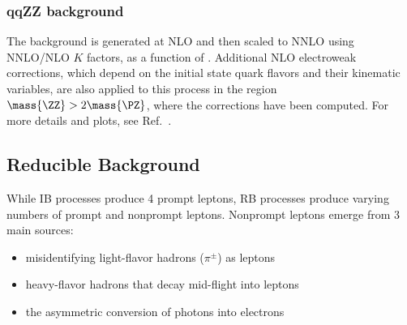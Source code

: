 \subsubsection{qqZZ background}
The \qqzzfourl background is generated at NLO and then scaled to NNLO using NNLO/NLO $K$ factors,
as a function of \mass{\ZZ}. Additional NLO electroweak corrections, which depend on the initial state quark flavors and their
kinematic variables, are also applied to this process in the region $\mass{\ZZ} > 2\mass{\PZ}$, where the corrections have been computed. 
For more details and plots, see Ref.~\cite{HIG_19_001}.

\subsection{Reducible Background}
\label{sec:redbkg}
While IB processes produce 4 prompt leptons, RB processes produce varying numbers of prompt and nonprompt leptons.
Nonprompt leptons emerge from 3 main sources:
\begin{itemize}
    \item misidentifying light-flavor hadrons (\eg $\pi^{\pm}$) as leptons
    \item heavy-flavor hadrons that decay mid-flight into leptons
    \item the asymmetric conversion of photons into electrons
\end{itemize}

